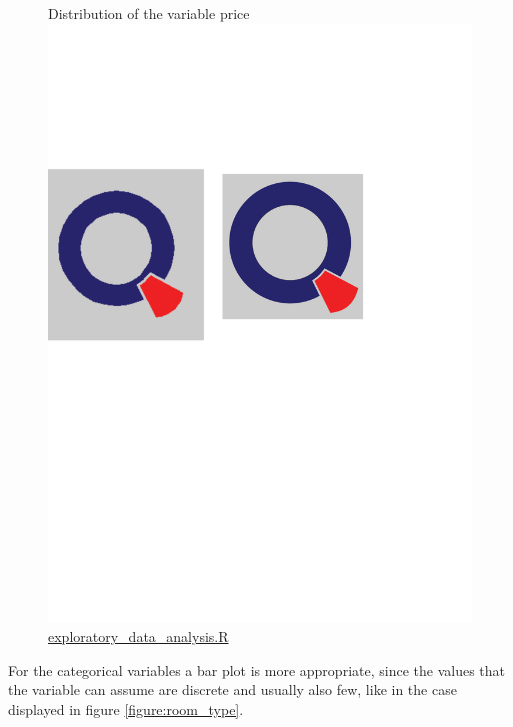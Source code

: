 \begin{figure}[H]
\caption{Distribution of the variable price \protect\includegraphics[scale=0.05]{qletlogo.pdf} {\href{https://github.com/silvia-ventoruzzo/SPL-WISE-2018/blob/master/exploratory_data_analysis.R}{exploratory\_data\_analysis.R}}}
\centering
\end{figure}

For the categorical variables a bar plot is more appropriate, since the values that the variable can assume are discrete and usually also few, like in the case displayed in figure \ref{figure:room_type}.




